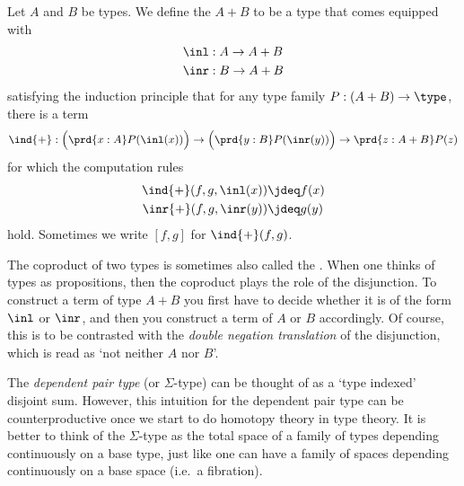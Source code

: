 \begin{defn}
Let $A$ and $B$ be types. We define the  $A+B$ to be a type that comes equipped with
\begin{align*}
\inl & : A \to A+B \\
\inr & : B \to A+B
\end{align*}
satisfying the induction principle that for any type family $P:(A+B)\to\type$, there is a term
\begin{equation*}
\ind{+} : \Big(\prd{x:A}P(\inl(x))\Big)\to\Big(\prd{y:B}P(\inr(y))\Big)\to\prd{z:A+B}P(z)
\end{equation*}
for which the computation rules
\begin{align*}
\ind{+}(f,g,\inl(x)) & \jdeq f(x) \\
\inr{+}(f,g,\inr(y)) & \jdeq g(y)
\end{align*}
hold. Sometimes we write $[f,g]$ for $\ind{+}(f,g)$.
\end{defn}

The coproduct of two types is sometimes also called the .
When one thinks of types as propositions, then the coproduct plays the role of the disjunction.
To construct a term of type $A+B$ you first have to decide whether it is of the form $\inl$ or $\inr$, and then you construct a term of $A$ or $B$ accordingly. Of course, this is to be contrasted with the \emph{double negation translation} of the disjunction, which is read as `not neither $A$ nor $B$'. 

The \emph{dependent pair type} (or $\Sigma$-type) can be thought of as a `type indexed' disjoint sum.
However, this intuition for the dependent pair type can be counterproductive once we start to do homotopy theory in type theory.
It is better to think of the $\Sigma$-type as the total space of a family of types depending continuously on a base type, just like one can have a family of spaces depending continuously on a base space (i.e.~a fibration).

